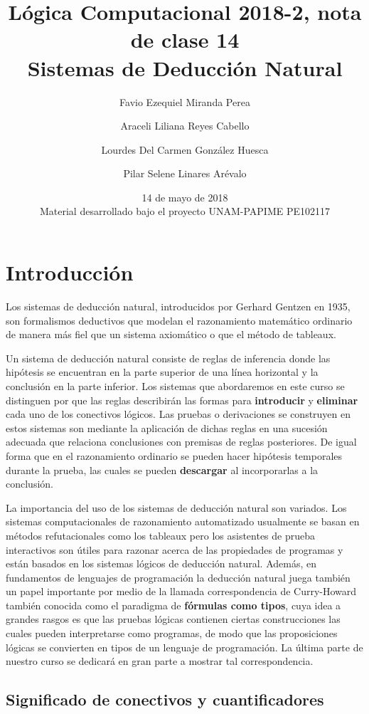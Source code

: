 \documentclass[11pt,letterpaper]{article}
\title{Lógica Computacional 2018-2, nota de clase 14\\
Sistemas de Deducción Natural
}
\author{Favio Ezequiel Miranda Perea \and Araceli Liliana Reyes Cabello\and
Lourdes Del Carmen Gonz\'alez Huesca \and Pilar Selene Linares Arévalo}
\date{14 de mayo de 2018 \\
Material desarrollado bajo el proyecto UNAM-PAPIME PE102117}
\begin{document}
\maketitle

\section{Introducción}

Los sistemas de deducción natural, introducidos por Gerhard Gentzen en 1935, son
formalismos deductivos que modelan el razonamiento matemático ordinario de
manera más fiel que un sistema axiomático o que el método de tableaux.  

Un sistema de deducción natural consiste de reglas de inferencia donde las 
hip\'otesis se encuentran en la parte superior de una l\'inea horizontal y la 
conclusión en la parte inferior.
Los sistemas que abordaremos en este curso se distinguen por que las reglas 
describir\'an las formas para \textbf{introducir} y \textbf{eliminar} cada uno 
de los conectivos lógicos. 
Las pruebas o derivaciones se construyen en estos sistemas son mediante la 
aplicación de dichas reglas en una sucesión adecuada que relaciona conclusiones 
con premisas de reglas posteriores. De igual forma que en el razonamiento 
ordinario se pueden hacer hipótesis temporales durante la prueba, las cuales se 
pueden \textbf{descargar} al incorporarlas a la conclusión. 


La importancia del uso de los sistemas de deducción natural son variados. 
Los sistemas computacionales de razonamiento automatizado usualmente se basan 
en métodos refutacionales como los tableaux pero los asistentes de prueba 
interactivos son útiles para razonar acerca de las propiedades de programas y 
est\'an basados en los sistemas lógicos de deducción natural.
Adem\'as, en fundamentos de lenguajes de programación la deducción natural 
juega también un papel importante por medio de la llamada correspondencia de 
Curry-Howard también conocida como el paradigma de \textbf{fórmulas como tipos}, 
cuya idea a grandes rasgos es que las pruebas lógicas contienen ciertas 
construcciones las cuales pueden interpretarse como programas, de modo que las 
proposiciones lógicas se convierten en tipos de un lenguaje de programación. La 
última parte de nuestro curso se dedicará en gran parte a mostrar tal 
correspondencia.


\subsection{Significado de conectivos y cuantificadores}
\end{document}
